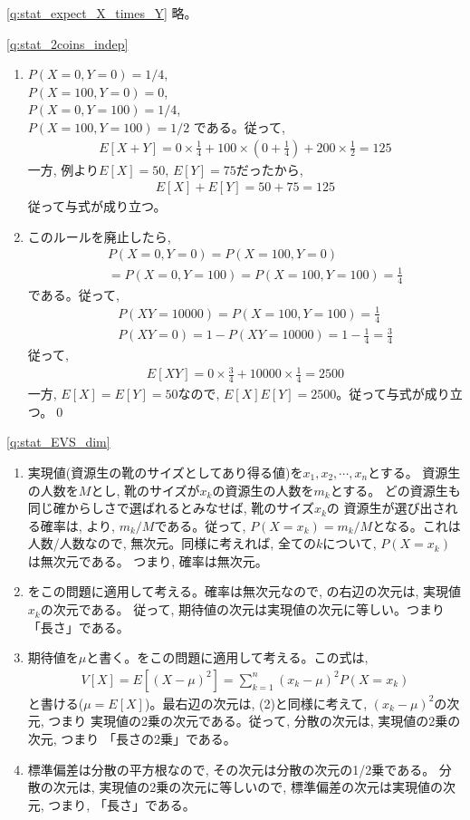 \ref{q:stat_expect_X_times_Y} 略。
\mv

%
\ref{q:stat_2coins_indep} 
\begin{enumerate}
\item
$P(X=0, Y=0)=1/4$,\\
$P(X=100, Y=0)=0$,\\
$P(X=0, Y=100)=1/4$,\\
$P(X=100, Y=100)=1/2$ である。従って, 
\begin{eqnarray*}E[X+Y]=0\times\frac{1}{4}+100\times(0+\frac{1}{4})+200\times\frac{1}{2}=125\end{eqnarray*}
一方, 例より$E[X]=50$, $E[Y]=75$だったから, 
\begin{eqnarray*}E[X]+E[Y]=50+75=125\end{eqnarray*}
従って与式が成り立つ。
\item このルールを廃止したら, 
\begin{eqnarray*}
&&P(X=0, Y=0)=P(X=100, Y=0)\\
&&=P(X=0, Y=100)=P(X=100, Y=100)=\frac{1}{4}
\end{eqnarray*}
である。従って, 
\begin{eqnarray*}
&&P(XY=10000)=P(X=100, Y=100)=\frac{1}{4}\\
&&P(XY=0)=1-P(XY=10000)=1-\frac{1}{4}=\frac{3}{4}
\end{eqnarray*}
従って, 
\begin{eqnarray*}E[XY]=0\times\frac{3}{4}+10000\times\frac{1}{4}=2500\end{eqnarray*}
一方, $E[X]=E[Y]=50$なので, $E[X]E[Y]=2500$。従って与式が成り立つ。\qed
\end{enumerate}
\mv

%
\ref{q:stat_EVS_dim}　
\begin{enumerate}
\item 実現値(資源生の靴のサイズとしてあり得る値)を$x_1, x_2, \cdots, x_n$とする。
資源生の人数を$M$とし, 靴のサイズが$x_k$の資源生の人数を$m_k$とする。
どの資源生も同じ確からしさで選ばれるとみなせば, 靴のサイズ$x_k$の
資源生が選び出される確率は, より, 
$m_k/M$である。従って, $P(X=x_k)=m_k/M$となる。これは人数/人数なので, 
無次元。同様に考えれば, 全ての$k$について, $P(X=x_k)$は無次元である。
つまり, 確率は無次元。
\item {}をこの問題に適用して考える。確率は無次元なので, 
の右辺の次元は, 実現値$x_k$の次元である。
従って, 期待値の次元は実現値の次元に等しい。つまり「長さ」である。
\item 期待値を$\mu$と書く。をこの問題に適用して考える。この式は, 
\begin{eqnarray*}
V[X]=E[(X-\mu)^2]=\sum_{k=1}^{n}(x_k-\mu)^2P(X=x_k)
\end{eqnarray*}
と書ける($\mu=E[X]$)。最右辺の次元は, (2)と同様に考えて, $(x_k-\mu)^2$の次元, つまり
実現値の2乗の次元である。従って, 分散の次元は, 実現値の2乗の次元, つまり
「長さの2乗」である。
\item 標準偏差は分散の平方根なので, その次元は分散の次元の1/2乗である。
分散の次元は, 実現値の2乗の次元に等しいので, 標準偏差の次元は実現値の次元, 
つまり, 「長さ」である。
\end{enumerate}

